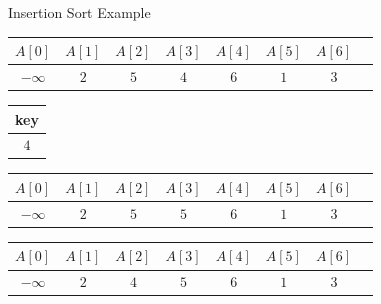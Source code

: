 \begin{frame}{Insertion Sort Example}
\vspace{1cm}
\begin{tabular}{|c|c|c|c|c|c|c|c|}
\hline
$A[0]$ & $A[1]$ & $A[2]$ & $A[3]$ & $A[4]$ & $A[5]$ & $A[6]$\\
\hline
$-\infty$ & $2$ &\cellcolor{yellow} $5$ &\cellcolor{orange} $4$ & $6$ & $1$ & $3$ \\
\hline
\end{tabular}
\vspace{1cm}
\begin{table}[!hbt]
\begin{tabular}{|c|}
\hline key\\
\hline $4$\\
\hline
\end{tabular}\hspace{1cm}
%
\begin{tabular}{|c|c|c|c|c|c|c|c|}
\hline
$A[0]$ & $A[1]$ & $A[2]$ & $A[3]$ & $A[4]$ & $A[5]$ & $A[6]$\\
\hline
$-\infty$ & $2$ & $5$ &\cellcolor{orange} $5$ & $6$ & $1$ & $3$ \\
\hline
\end{tabular}
\end{table}


\begin{tabular}{|c|c|c|c|c|c|c|c|}
\hline
$A[0]$ & $A[1]$ & $A[2]$ & $A[3]$ & $A[4]$ & $A[5]$ & $A[6]$\\
\hline
$-\infty$ &\cellcolor{statalegreen} $2$ &\cellcolor{statalegreen} $4$ & \cellcolor{statalegreen}$5$ & $6$ & $1$ & $3$ \\
\hline
\end{tabular}

\end{frame}

